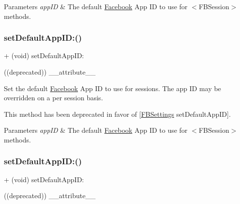 \begin{DoxyParams}{Parameters}
{\em app\+ID} & The default \hyperlink{interfaceFacebook}{Facebook} App ID to use for $<$\+F\+B\+Session$>$ methods. \\
\hline
\end{DoxyParams}
\mbox{\label{interfaceFBSession_afb4f41ffcd4d824a16147cb41b932a32}} 
\subsubsection{\texorpdfstring{set\+Default\+App\+I\+D\+:()}{setDefaultAppID:()}\hspace{0.1cm}{\footnotesize\ttfamily [3/5]}}
{\footnotesize\ttfamily + (void) set\+Default\+App\+I\+D\+: \begin{DoxyParamCaption}\item[{((deprecated))}]{\+\_\+\+\_\+attribute\+\_\+\+\_\+ }\end{DoxyParamCaption}}

Set the default \hyperlink{interfaceFacebook}{Facebook} App ID to use for sessions. The app ID may be overridden on a per session basis.

This method has been deprecated in favor of \mbox{[}\hyperlink{interfaceFBSettings}{F\+B\+Settings} set\+Default\+App\+ID\mbox{]}.


\begin{DoxyParams}{Parameters}
{\em app\+ID} & The default \hyperlink{interfaceFacebook}{Facebook} App ID to use for $<$\+F\+B\+Session$>$ methods. \\
\hline
\end{DoxyParams}
\mbox{\label{interfaceFBSession_afb4f41ffcd4d824a16147cb41b932a32}} 
\subsubsection{\texorpdfstring{set\+Default\+App\+I\+D\+:()}{setDefaultAppID:()}\hspace{0.1cm}{\footnotesize\ttfamily [4/5]}}
{\footnotesize\ttfamily + (void) set\+Default\+App\+I\+D\+: \begin{DoxyParamCaption}\item[{((deprecated))}]{\+\_\+\+\_\+attribute\+\_\+\+\_\+ }\end{DoxyParamCaption}}

